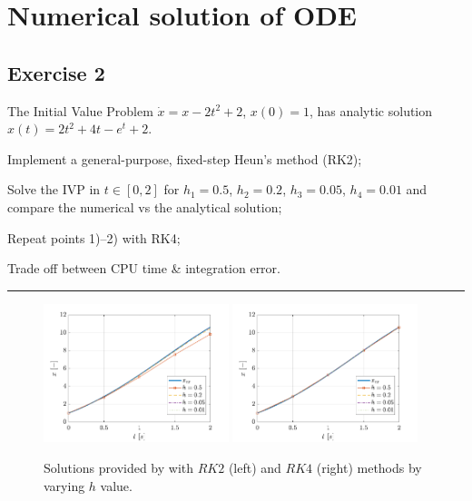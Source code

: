 \documentclass[11pt,a4paper,oneside]{article}
\begin{document}
\clearpage


\section{Numerical solution of ODE}

\subsection*{Exercise 2}

The Initial Value Problem $\dot x = x- 2t^2+2$, $x(0) = 1$, has analytic solution $x(t) = 2t^2 + 4t - e^t + 2$. 
\begin{enumerate*}[label=\arabic*)]
    \item Implement a general-purpose, fixed-step Heun's method (RK2);
    \item Solve the IVP in $t\in[0,2]$ for $h_1 = 0.5$, $h_2 = 0.2$, $h_3 = 0.05$, $h_4 = 0.01$ and compare the numerical vs the analytical solution;
    \item Repeat points 1)--2) with RK4;
    \item Trade off between CPU time \& integration error.
\end{enumerate*}

\medskip \hrule \medskip

\begin{figure}[ht]
    \centering
    \includegraphics[width = 0.48\textwidth]{gfx/ex2_1.pdf}
    \includegraphics[width = 0.48\textwidth]{gfx/ex2_2.pdf}
    \caption{Solutions provided by with $RK2$ (left) and $RK4$ (right) methods by varying $h$ value.}
    \label{fig:ex2_sol}
\end{figure}
\end{document}
